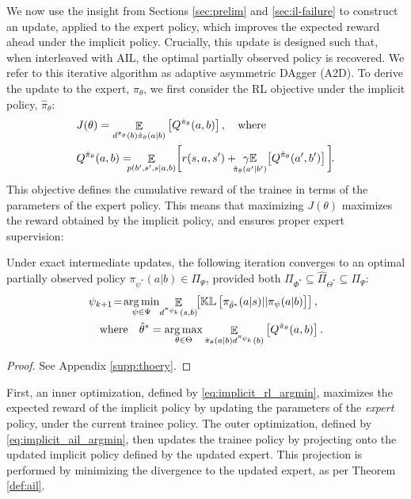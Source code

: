 \label{sec:algorithm}

We now use the insight from Sections \ref{sec:prelim} and \ref{sec:il-failure} to construct an update, applied to the expert policy, which improves the expected reward ahead under the implicit policy.  Crucially, this update is designed such that, when interleaved with AIL, the optimal partially observed policy is recovered.  We refer to this iterative algorithm as adaptive asymmetric DAgger (A2D). To derive the update to the expert, $\pi_{\theta}$, we first consider the RL objective under the implicit policy, $\hat{\pi}_{\theta}$:
\begin{align}
     &J(\theta) = \mathop{\mathbb{E}}_{d^{{\hat{\pi}_{\theta}}}(b) \hat{\pi}_\theta(a|b) } \left[ Q^{{\hat{\pi}_{\theta}}}(a,b) \right], \where \\
    & Q^{{\hat{\pi}_{\theta}}}(a,b) =\!\!\!\! \mathop{\mathbb{E}}_{ p(b',s',s|a,b)} \!\bigg[ r(s,a,s') + \!\!\! \mathop{\gamma\mathbb{E}}_{\hat{\pi}_\theta(a'|b')} \! \left[ Q^{\hat{\pi}_\theta} (a', b') \right] \bigg] \!. \nonumber 
\end{align}
This objective defines the cumulative reward of the trainee in terms of the parameters of the expert policy. This means that maximizing $J(\theta)$ maximizes the reward obtained by the implicit policy, and ensures proper expert supervision:
\begin{theorem}
\label{thm:conv_exact} 
Under exact intermediate updates, the following iteration converges to an optimal partially observed policy $\pi_{\psi^*}(a|b)\in\Pi_{\Psi}$, provided both  $\Pi_{\Phi^*} \subseteq \hat{\Pi}_{\Theta^*} \subseteq \Pi_{\Psi}$:
\begin{align}
    \!&\psi_{k+1} \! = \! \mathop{\operatorname{arg\,min}}_{\psi \in \Psi} \!\mathop{\mathbb{E}}_{d^{\pi_{\psi_k}}(s,b)} \!\! \left[ \mathbb{KL} \left[ \pi_{\hat{\theta}^*}(a|s) || \pi_\psi(a|b) \right] \right], \label{eq:implicit_ail_argmin}\\
    &\quad \text{where }\ \   \hat{\theta}^* = \mathop{\operatorname{arg\,max}}_{\theta \in \Theta} \mathop{\mathbb{E}}_{\hat{\pi}_{\theta}(a | b) d^{{\pi_{\psi_k}}}(b)} \left[Q^{{\hat{\pi}_{\theta}}}(a,b) \right]. \label{eq:implicit_rl_argmin}
\end{align}
\end{theorem}
\vspace{-0.2cm}
\begin{proof}
\vspace{-0.2cm}
See Appendix \ref{supp:thoery}.
\end{proof}
\vspace{-0.2cm}
First, an inner optimization, defined by \eqref{eq:implicit_rl_argmin}, maximizes the expected reward of the implicit policy by updating the parameters of the \emph{expert} policy, under the current trainee policy.  The outer optimization, defined by \eqref{eq:implicit_ail_argmin}, then updates the trainee policy by projecting onto the updated implicit policy defined by the updated expert. This projection is performed by minimizing the divergence to the updated expert, as per Theorem \ref{def:ail}.  %

